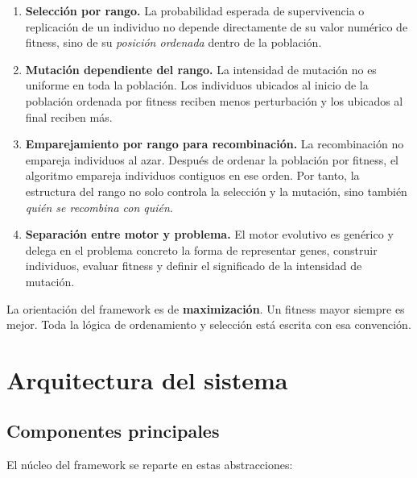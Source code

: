 \documentclass[11pt]{article}
\begin{document}
\begin{enumerate}
  \item \textbf{Selecci\'on por rango.}
  La probabilidad esperada de supervivencia o replicaci\'on de un individuo no
  depende directamente de su valor num\'erico de fitness, sino de su
  \emph{posici\'on ordenada} dentro de la poblaci\'on.

  \item \textbf{Mutaci\'on dependiente del rango.}
  La intensidad de mutaci\'on no es uniforme en toda la poblaci\'on. Los
  individuos ubicados al inicio de la poblaci\'on ordenada por fitness reciben
  menos perturbaci\'on y los ubicados al final reciben m\'as.

  \item \textbf{Emparejamiento por rango para recombinaci\'on.}
  La recombinaci\'on no empareja individuos al azar. Despu\'es de ordenar la
  poblaci\'on por fitness, el algoritmo empareja individuos contiguos en ese
  orden. Por tanto, la estructura del rango no solo controla la selecci\'on y
  la mutaci\'on, sino tambi\'en \emph{qui\'en se recombina con qui\'en}.

  \item \textbf{Separaci\'on entre motor y problema.}
  El motor evolutivo es gen\'erico y delega en el problema concreto la forma de
  representar genes, construir individuos, evaluar fitness y definir el
  significado de la intensidad de mutaci\'on.
\end{enumerate}

La orientaci\'on del framework es de \textbf{maximizaci\'on}. Un fitness mayor
siempre es mejor. Toda la l\'ogica de ordenamiento y selecci\'on est\'a escrita
con esa convenci\'on.

\section{Arquitectura del sistema}

\subsection{Componentes principales}

El n\'ucleo del framework se reparte en estas abstracciones:
\end{document}
